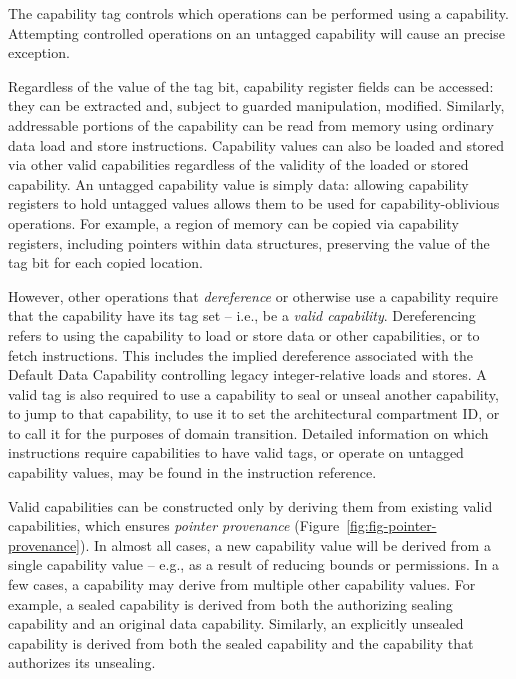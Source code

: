 The capability tag controls which operations can be performed using a
capability.
Attempting controlled operations on an untagged capability will cause an
precise exception.

Regardless of the value of the tag bit, capability register fields can be
accessed: they can be extracted and, subject to guarded manipulation,
modified.
Similarly, addressable portions of the capability can be read from memory
using ordinary data load and store instructions.
Capability values can also be loaded and stored via other valid capabilities
regardless of the validity of the loaded or stored capability.
An untagged capability value is simply data: allowing capability registers to
hold untagged values allows them to be used for capability-oblivious
operations.
For example, a region of memory can be copied via capability registers, including pointers within data structures, preserving the value of the
tag bit for each copied location.

However, other operations that \textit{dereference} or otherwise use a
capability require that the capability have its tag set -- i.e., be a
\textit{valid capability}.
Dereferencing refers to using the capability to load or store data or other
capabilities, or to fetch instructions.
This includes the implied dereference associated with the Default Data
Capability controlling legacy integer-relative loads and stores.
A valid tag is also required to use a capability to seal or unseal another
capability, to jump to that capability, to use it to set the architectural
compartment ID, or to call it for the purposes of domain transition.
Detailed information on which instructions require capabilities to have valid
tags, or operate on untagged capability values, may be found in the
instruction reference.

Valid capabilities can be constructed only by deriving them from existing
valid capabilities, which ensures \textit{pointer provenance}
(Figure~\ref{fig:fig-pointer-provenance}).
In almost all cases, a new capability value will be derived from a single
capability value -- e.g., as a result of reducing bounds or permissions.
In a few cases, a capability may derive from multiple other capability
values.
For example, a sealed capability is derived from both the authorizing sealing
capability and an original data capability.
Similarly, an explicitly unsealed capability is derived from both the sealed
capability and the capability that authorizes its unsealing.

